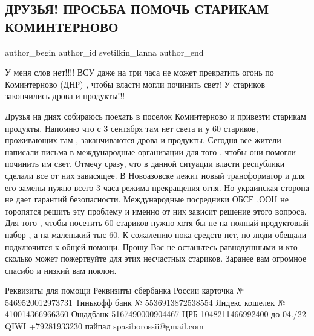 
 
 
 
 
 
\subsection{ДРУЗЬЯ! ПРОСЬБА ПОМОЧЬ СТАРИКАМ КОМИНТЕРНОВО}
\label{sec:23_09_2021.fb.svetilkin_lanna.1.kominternovo_stariki_vsu_dnr}
 
\ifcmt
 author_begin
   author_id svetilkin_lanna
 author_end
\fi

У меня слов нет!!!! ВСУ даже на три часа не может прекратить огонь по
Коминтерново (ДНР) , чтобы власти могли починить свет! У стариков закончились
дрова и продукты!!!


Друзья на днях собираюсь поехать в поселок Коминтерново и привезти старикам
продукты. Напомню что с 3 сентября там нет света и у 60 стариков, проживающих
там , заканчиваются дрова и продукты. Сегодня все жители написали письма в
международные организации для того , чтобы они помогли починить им свет. Отмечу
сразу, что в данной ситуации власти республики сделали все от них зависящее. В
Новоазовске лежит новый трансформатор и для его замены нужно всего 3 часа
режима прекращения огня. Но украинская сторона не дает гарантий безопасности.
Международные посредники ОБСЕ ,ООН не торопятся решить эту проблему и именно от
них зависит решение этого вопроса. Для того , чтобы посетить 60 стариков нужно
хотя бы не на полный продуктовый набор , а на маленький тыс 60. К сожалению
пока средств нет, но люди обещали подключится к общей помощи. Прошу Вас не
останьтесь равнодушными и кто сколько может пожертвуйте для этих несчастных
стариков. Заранее вам огромное спасибо и низкий вам поклон.

\obeycr
Реквизиты для помощи
Реквизиты сбербанка России карточка № 5469520012973731
Тинькофф банк № 5536913872538554
Яндекс кошелек № 410014366966360
Ощадбанк 5167490000904467
ЦРБ 1048211466992400 до 04./22
QIWI +79281933230
пайпал spasiborossii@gmail.com
\restorecr
